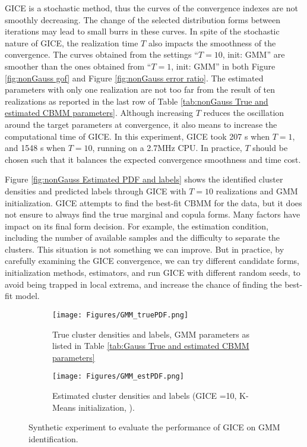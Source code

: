 GICE is a stochastic method, thus the curves of the convergence indexes are not smoothly 
decreasing.
The change of the selected distribution forms between iterations may lead to small burrs in these curves. In spite of the stochastic nature of GICE, the realization time $T$ also impacts the smoothness of the convergence. The curves obtained from the settings ``$T=10$, init: GMM'' are smoother than the ones obtained from ``$T=1$, init: GMM'' in both Figure \ref{fig:nonGauss gof} and Figure \ref{fig:nonGauss error ratio}. The estimated parameters with only one realization are not too far from the result of ten realizations as reported in the last row of Table \ref{tab:nonGauss True and estimated CBMM parameters}. 
Although increasing $T$ reduces the oscillation around the target parameters at convergence, it also means to increase the computational time of GICE. In this experiment, GICE took 207 s when $T=1$, and 1548 s when $T=10$, running on a 2.7MHz CPU. In practice, $T$ should be chosen such that it balances the expected convergence smoothness and time cost.

Figure \ref{fig:nonGauss Estimated PDF and labels} shows the identified cluster densities and predicted labels through GICE with $T=10$ realizations and GMM initialization. GICE attempts to find the best-fit CBMM for the data, but it does not ensure to always find the true marginal and copula forms. Many factors have impact on its final form decision. For example, the estimation condition, including the 
number of available samples and the difficulty to separate the clusters. This situation is not something we can improve. But in practice, by carefully examining the GICE convergence, we can try different candidate forms, initialization methods, estimators, and run GICE with different random seeds, to avoid being trapped in local extrema, and increase the chance of finding the best-fit model. 

\begin{figure}[tb]
\centering
\begin{subfigure}[t]{0.49\textwidth}
  \centering
  \texttt{[image: Figures/GMM\_truePDF.png]}
  \captionsetup{width=.8\linewidth}
  \caption{True cluster densities and labels, GMM parameters as listed in Table \ref{tab:Gauss True and estimated CBMM parameters}}
  \label{fig:Gauss True PDF and labels}
\end{subfigure}%
\begin{subfigure}[t]{0.49\textwidth}
  \centering
  \texttt{[image: Figures/GMM\_estPDF.png]}
  \captionsetup{width=.95\linewidth}
  \caption{Estimated cluster densities and labels (GICE =10, K-Means initialization, ).}
  \label{fig:Gauss Estimated PDF and labels}
\end{subfigure}
\caption{Synthetic experiment  to evaluate the performance of GICE on GMM identification.}
\label{fig:Gauss CBMM PDF and labels}
\end{figure}

